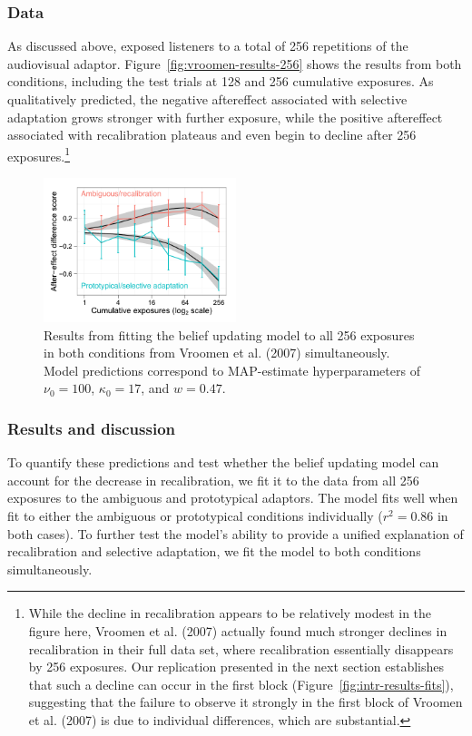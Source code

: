 \subsubsection{Data}
As discussed above, \textcite{Vroomen2007} exposed listeners to a total of 256 repetitions of the audiovisual adaptor.  Figure~\ref{fig:vroomen-results-256} shows the results from both conditions, including the test trials at 128 and 256 cumulative exposures.  As qualitatively predicted, the negative aftereffect associated with selective adaptation grows stronger with further exposure, while the positive aftereffect associated with recalibration plateaus and even begin to decline after 256 exposures.\footnote{While the decline in recalibration appears to be relatively modest in the figure here, Vroomen et al. (2007) actually found much stronger declines in recalibration in their full data set, where recalibration essentially disappears by 256 exposures.  Our replication presented in the next section establishes that such a decline can occur in the first block (Figure~\ref{fig:intr-results-fits}), suggesting that the failure to observe it strongly in the first block of Vroomen et al. (2007) is due to individual differences, which are substantial.}

\begin{figure}[htb]
  \centering
  \includegraphics[width=0.5\textwidth]{vroomen-preds-firstblock.pdf}
  \caption{Results from fitting the belief updating model to all 256 exposures in both conditions from Vroomen et al. (2007) simultaneously.  Model predictions correspond to MAP-estimate hyperparameters of $\nu_0 = 100$, $\kappa_0=17$, and $w=0.47$.}
  \label{fig:model-fits-vroomen-256-simult}
\end{figure}

\subsubsection{Results and discussion}
To quantify these predictions and test whether the belief updating model can account for the decrease in recalibration, we fit it to the data from all 256 exposures to the ambiguous and prototypical adaptors.
The model fits well when fit to either the ambiguous or prototypical conditions individually ($r^2=0.86$ in both cases). To further test the model's ability to provide a unified explanation of recalibration and selective adaptation, we fit the model to both conditions simultaneously.

